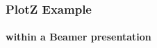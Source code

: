 \documentclass{beamer}
\begin{document}
\begin{frame}
  \frametitle{PlotZ Example}
  \framesubtitle{within a Beamer presentation}
  \centering
\end{frame}
\end{document}
